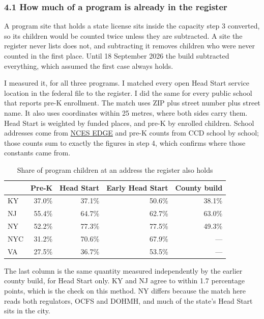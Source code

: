 \documentclass[11pt]{article}
\begin{document}
\subsubsection*{4.1 How much of a program is already in the register}

A program site that holds a state license sits inside the capacity step 3
converted, so its children would be counted twice unless they are subtracted. A
site the register never lists does not, and subtracting it removes children who
were never counted in the first place. Until 18 September 2026 the build
subtracted everything, which assumed the first case always holds.

I measured it, for all three programs. I matched every open Head Start service
location in the federal file to the register. I did the same for every public
school that reports pre-K enrollment. The match uses ZIP plus street number plus
street name. It also uses coordinates within 25 metres, where both sides carry
them. Head Start is weighted by funded places, and pre-K by enrolled children. School addresses come from
\href{https://nces.ed.gov/programs/edge/data/EDGE_GEOCODE_PUBLICSCH_1819.zip}{NCES
EDGE} and pre-K counts from CCD school by school; those counts sum to exactly the
figures in step 4, which confirms where those constants came from.

\begin{table}[H]
\centering
\caption{Share of program children at an address the register also holds}
\begin{tabular}{L{1.6cm}rrrr}
\toprule
& \textbf{Pre-K} & \textbf{Head Start} & \textbf{Early Head Start} & \textbf{County build} \\
\midrule
KY  & 37.0\% & 37.1\% & 50.6\% & 38.1\% \\
NJ  & 55.4\% & 64.7\% & 62.7\% & 63.0\% \\
NY  & 52.2\% & 77.3\% & 77.5\% & 49.3\% \\
NYC & 31.2\% & 70.6\% & 67.9\% & --- \\
VA  & 27.5\% & 36.7\% & 53.5\% & --- \\
\bottomrule
\end{tabular}
\end{table}

The last column is the same quantity measured independently by the earlier county
build, for Head Start only. KY and NJ agree to within 1.7 percentage points,
which is the check on this method. NY differs because the match here reads both
regulators, OCFS and DOHMH, and much of the state's Head Start sits in the city.
\end{document}
